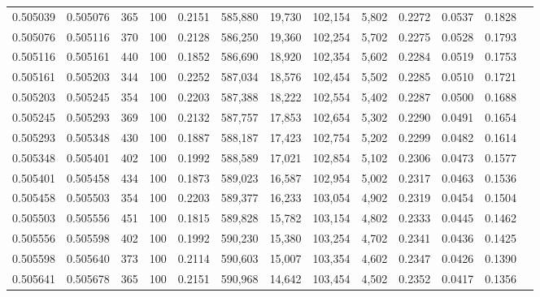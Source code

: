 \begin{tabular}{rrrrrrrrrrrrr}
0.505039 & 0.505076 &   365 & 100 &                                     0.2151 & 585,880 &  19,730 & 102,154 &   5,802 & 0.2272 & 0.0537 & 0.1828 \\
0.505076 & 0.505116 &   370 & 100 &                                     0.2128 & 586,250 &  19,360 & 102,254 &   5,702 & 0.2275 & 0.0528 & 0.1793 \\
0.505116 & 0.505161 &   440 & 100 &                                     0.1852 & 586,690 &  18,920 & 102,354 &   5,602 & 0.2284 & 0.0519 & 0.1753 \\
0.505161 & 0.505203 &   344 & 100 &                                     0.2252 & 587,034 &  18,576 & 102,454 &   5,502 & 0.2285 & 0.0510 & 0.1721 \\
0.505203 & 0.505245 &   354 & 100 &                                     0.2203 & 587,388 &  18,222 & 102,554 &   5,402 & 0.2287 & 0.0500 & 0.1688 \\
0.505245 & 0.505293 &   369 & 100 &                                     0.2132 & 587,757 &  17,853 & 102,654 &   5,302 & 0.2290 & 0.0491 & 0.1654 \\
0.505293 & 0.505348 &   430 & 100 &                                     0.1887 & 588,187 &  17,423 & 102,754 &   5,202 & 0.2299 & 0.0482 & 0.1614 \\
0.505348 & 0.505401 &   402 & 100 &                                     0.1992 & 588,589 &  17,021 & 102,854 &   5,102 & 0.2306 & 0.0473 & 0.1577 \\
0.505401 & 0.505458 &   434 & 100 &                                     0.1873 & 589,023 &  16,587 & 102,954 &   5,002 & 0.2317 & 0.0463 & 0.1536 \\
0.505458 & 0.505503 &   354 & 100 &                                     0.2203 & 589,377 &  16,233 & 103,054 &   4,902 & 0.2319 & 0.0454 & 0.1504 \\
0.505503 & 0.505556 &   451 & 100 &                                     0.1815 & 589,828 &  15,782 & 103,154 &   4,802 & 0.2333 & 0.0445 & 0.1462 \\
0.505556 & 0.505598 &   402 & 100 &                                     0.1992 & 590,230 &  15,380 & 103,254 &   4,702 & 0.2341 & 0.0436 & 0.1425 \\
0.505598 & 0.505640 &   373 & 100 &                                     0.2114 & 590,603 &  15,007 & 103,354 &   4,602 & 0.2347 & 0.0426 & 0.1390 \\
0.505641 & 0.505678 &   365 & 100 &                                     0.2151 & 590,968 &  14,642 & 103,454 &   4,502 & 0.2352 & 0.0417 & 0.1356 \\

\end{tabular}
